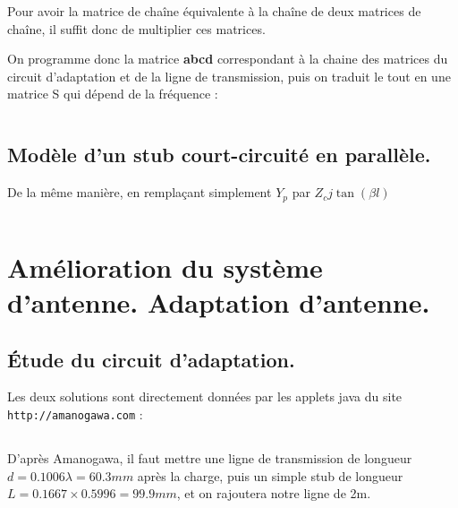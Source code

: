 \documentclass[10pt]{article}
\begin{document}
\begin{itemize}
        Pour avoir la matrice de chaîne équivalente à la chaîne de deux matrices de chaîne, il suffit donc de multiplier ces matrices.

        On programme donc la matrice \textbf{abcd} correspondant à la chaine des matrices du circuit d'adaptation et de la ligne de transmission, puis on traduit le tout en une matrice S qui dépend de la fréquence : 

        \newpage
        \inputminted[linenos]{matlab}{src/1c.m}


\end{itemize}

\subsection{Modèle d'un stub court-circuité en parallèle.}
De la même manière, en remplaçant simplement $Y_p$ par $Z_c j \tan(\beta l)$

%
\inputminted[linenos]{matlab}{src/1d.m}


\section{Amélioration du système d'antenne. Adaptation d'antenne.}
\subsection{Étude du circuit d'adaptation.}
Les deux solutions sont directement données par les applets java du site \verb|http://amanogawa.com| :

\begin{center}

\end{center}
\subsection{}

D'après Amanogawa, il faut mettre une ligne de transmission de longueur $d=0.1006 \lambda = 60.3mm$ après la charge, puis un simple stub de longueur $L=0.1667\times 0.5996=99.9mm$, et on rajoutera notre ligne de 2m.
\end{document}
